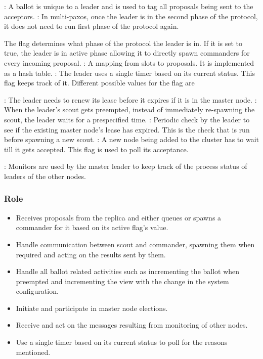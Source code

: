 \begin{itemize}
    : A ballot is unique to a leader and is used to tag all
    proposals being sent to the acceptors.
    : In multi-paxos, once the leader is in the second phase of
    the protocol, it does not need to run first phase of the protocol again.

    The  flag determines what phase of the protocol the leader is
    in.
    If it is set to true, the leader is in active phase allowing it to directly
    spawn commanders for every incoming proposal.
    : A mapping from slots to proposals. It is implemented as
    a hash table.
    : The leader uses a single timer based on its current
    status. This flag keeps track of it. Different possible values for the flag
    are
    \begin{itemize}
        : The leader needs to renew its lease before it expires if
        it is in the master node.
        : When the leader's scout gets preempted, instead of
        immediately re-spawning the scout, the leader waits for a prespecified
         time.
        : Periodic check by the leader to see if the
        existing master node's lease has expired. This is the check that is run
        before spawning a new scout.
        : A new node being added to the cluster has to wait
        till it gets accepted. This flag is used to poll its acceptance.
    \end{itemize}
    : Monitors are used by the master leader to keep track of
    the process status of leaders of the other nodes.
\end{itemize}

\subsubsection{Role}

\begin{itemize}
  \item Receives proposals from the replica and either queues or spawns a
    commander for it based on its active flag's value.
  \item Handle communication between scout and commander, spawning them
    when required and acting on the results sent by them.
  \item Handle all ballot related activities such as incrementing the ballot
    when preempted and incrementing the view with the change in the system
    configuration.
  \item Initiate and participate in master node elections.
  \item Receive and act on the messages resulting from monitoring of other
    nodes.
  \item Use a single timer based on its current status to poll for the
    reasons mentioned.
\end{itemize}

